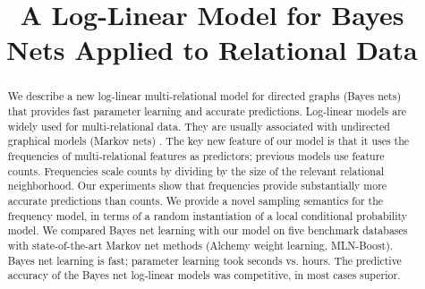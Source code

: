 \documentclass{article}
\title{A Log-Linear Model for Bayes Nets Applied to Relational Data}
\date{}
\begin{document}
\maketitle



\begin{abstract} 
We describe a new log-linear multi-relational model for directed graphs (Bayes nets) that provides fast parameter learning and accurate predictions. Log-linear models are widely used for multi-relational data. They are usually associated with undirected graphical models (Markov nets) \cite{Taskar2002,Domingos2009}. The key new feature of our model is that it uses the frequencies of multi-relational features as predictors; previous 
models use feature counts. Frequencies scale counts by dividing by the size of the relevant relational neighborhood. Our experiments show that frequencies provide substantially more accurate predictions than counts. We provide a novel sampling semantics for the frequency model, in terms of a random instantiation of a local conditional probability model. We compared Bayes net learning with our model on five benchmark databases with state-of-the-art Markov net methods (Alchemy weight learning, MLN-Boost). Bayes net learning is fast; parameter learning took seconds vs. hours. The predictive accuracy of the Bayes net log-linear models was competitive, in most cases superior. %
\end{abstract}
\end{document}
